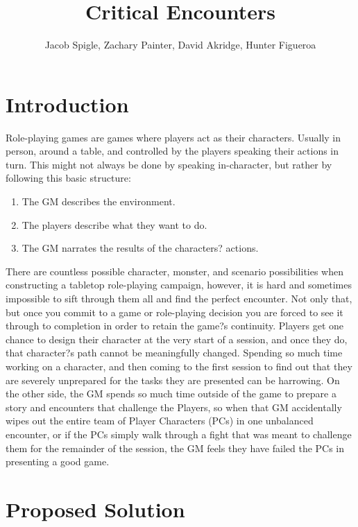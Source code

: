 \documentclass[12pt,a4paper]{report}
\author{Jacob Spigle, Zachary Painter, David Akridge, Hunter Figueroa}
\title{Critical Encounters}
\begin{document}
	
\maketitle

\tableofcontents
	
\newpage
\chapter*{Introduction}

Role-playing games are games where players act as their characters. Usually in person, around a table, and controlled by the players speaking their actions in turn. This might not always be done by speaking in-character, but rather by following this basic structure:

\begin{enumerate}
	\item The GM describes the environment.
	\item The players describe what they want to do.
	\item The GM narrates the results of the characters? actions.
\end{enumerate}

There are countless possible character, monster, and scenario possibilities when constructing a tabletop role-playing campaign, however, it is hard and sometimes impossible to sift through them all and find the perfect encounter. Not only that,  but once you commit to a game or role-playing decision you are forced to see it through to completion in order to retain the game?s continuity. Players get one chance to design their character at the very start of a session, and once they do, that character?s path cannot be meaningfully changed. Spending so much time working on a character, and then coming to the first session to find out that they are severely unprepared for the tasks they are presented can be harrowing. On the other side, the GM spends so much time outside of the game to prepare a story and encounters that challenge the Players, so when that GM accidentally wipes out the entire team of Player Characters (PCs) in one unbalanced encounter, or if the PCs simply walk through a fight that was meant to challenge them for the remainder of the session, the GM feels they have failed the PCs in presenting a good game.
\newpage
\chapter*{Proposed Solution}
\end{document}
